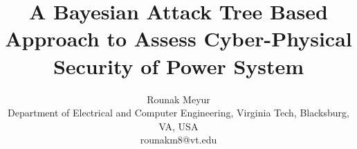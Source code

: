 \documentclass[conference]{IEEEtran}
\begin{document}
\title{A Bayesian Attack Tree Based Approach to Assess Cyber-Physical Security of Power System}

\author{Rounak Meyur
\\Department of Electrical and Computer Engineering, Virginia Tech, Blacksburg, VA, USA\\
rounakm8@vt.edu}

\maketitle











\end{document}
